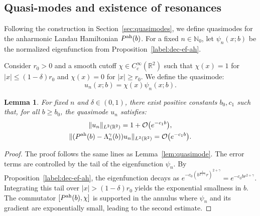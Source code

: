 \documentclass[11pt]{amsart}
\newtheorem{lemma}[theorem]{Lemma}
\theoremstyle{remark}
\newcommand{\R}{\mathbb{R}}
\numberwithin{equation}{section}
\begin{document}
\subsection{Quasi-modes and existence of resonances}


Following the construction in Section~\ref{sec:quasimodes}, we define quasimodes for the anharmonic Landau Hamiltonian $P^{\rm ah}(b)$. For a fixed $n \in \mathbb{N}_0$, let $\psi_n(x;b)$ be the normalized eigenfunction from Proposition~\ref{label:dec-ef-ah}.

Consider $r_0 > 0$ and a smooth cutoff $\chi \in C_c^\infty(\mathbb{R}^2)$ such that $\chi(x)=1$ for $|x| \le (1-\delta)r_0$ and $\chi(x)=0$ for $|x| \ge r_0$. We define the  quasimode:
\[
u_n(x;b) = \chi(x) \psi_n(x;b).
\]

\begin{lemma}\label{lem:quasimode-ah}
For fixed $n$ and $\delta \in (0,1)$, there exist positive constants $b_0,c_1$ such that, for all $b\geq b_0$, the quasimode $u_n$ satisfies:
\[\begin{gathered}
    \|u_n\|_{L^2(\R^2)} = 1 + \mathcal{O}\big( e^{-c_1 b} \big), \\
    \|(P^{\rm ah}(b) - \Lambda_n^\gamma(b))u_n\|_{L^2(\R^2)} = \mathcal{O}\big( e^{-c_1 b} \big).
\end{gathered}\]
\end{lemma}
%
\begin{proof}
The proof follows the same lines as Lemma~\ref{lem:quasimode}. The error terms are controlled by the tail of the eigenfunction $\psi_n$. By Proposition~\ref{label:dec-ef-ah}, the eigenfunction decays as $e^{-c_0 (b^{\frac{1}{2+\gamma}} r)^{2+\gamma}} = e^{-c_0 b r^{2+\gamma}}$. Integrating this tail over $|x| > (1-\delta)r_0$ yields the exponential smallness in $b$. The commutator $[P^{\rm ah}(b), \chi]$ is supported in the annulus where $\psi_n$ and its gradient are exponentially small, leading to the second estimate.
\end{proof}
\end{document}
